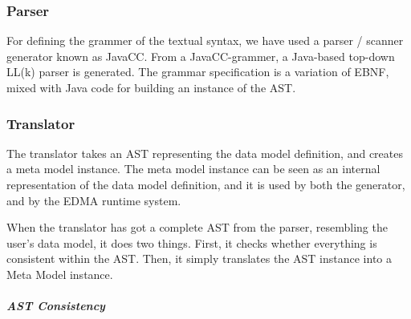 \subsubsection{Parser}

For defining the grammer of the textual syntax, we have used a parser
/ scanner generator known as JavaCC. From a JavaCC-grammer, a Java-based
top-down LL(k) parser is generated. The grammar specification is a
variation of EBNF, mixed with Java code for building an instance of
the AST.


\subsubsection{Translator}

The translator takes an AST representing the data model definition,
and creates a meta model instance. The meta model instance can be
seen as an internal representation of the data model definition, and
it is used by both the generator, and by the EDMA runtime system.

When the translator has got a complete AST from the parser, resembling
the user's data model, it does two things. First, it checks whether
everything is consistent within the AST. Then, it simply translates
the AST instance into a Meta Model instance.


\subparagraph{AST Consistency}

